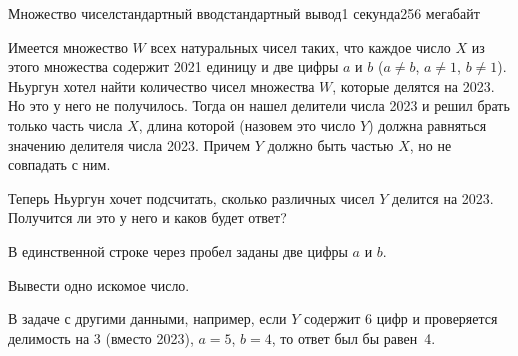 \begin{problem}[(Антонов Ю.\,С.)]{Множество чисел}{стандартный ввод}{стандартный вывод}{1 секунда}{256 мегабайт}

Имеется множество $W$ всех натуральных чисел таких, что каждое число $X$ из этого множества содержит 2021 единицу и две цифры $a$ и $b$ ($a \neq b$, $a \neq 1$, $b \neq 1$). Ньургун хотел найти количество чисел множества $W$,  которые делятся на 2023. Но это у него не получилось. Тогда он нашел делители числа 2023 и решил брать только часть числа $X$, длина которой (назовем это число $Y$) должна равняться значению делителя числа 2023. Причем $Y$ должно быть частью $X$, но не совпадать с ним. 

Теперь Ньургун хочет подсчитать, сколько различных чисел $Y$ делится на 2023. Получится ли это у него и каков будет ответ?


\InputFile
В единственной строке через пробел заданы две цифры $a$ и $b$.


\OutputFile
Вывести одно искомое число.

\Example

\begin{example}
%
\end{example}

\Note
В задаче с другими данными, например, если $Y$ содержит 6 цифр и проверяется делимость на 3 (вместо 2023), $a=5$, $b=4$, то ответ был бы равен~4.

\end{problem}


